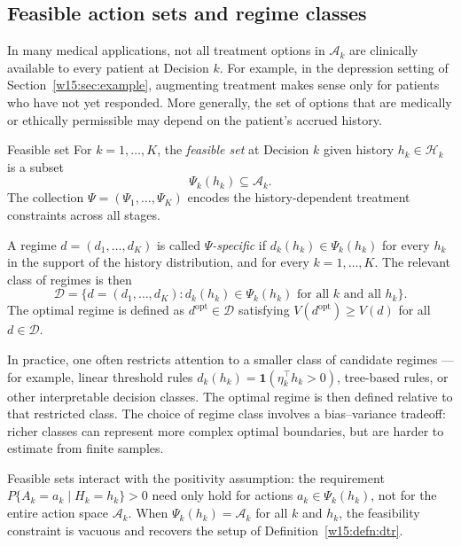 \documentclass[master.tex]{subfiles}
\begin{document}
\subsection{Feasible action sets and regime classes}

In many medical applications, not all treatment options in $\mathcal{A}_k$ are clinically available to every patient at Decision $k$. For example, in the depression setting of Section~\ref{w15:sec:example}, augmenting treatment makes sense only for patients who have not yet responded. More generally, the set of options that are medically or ethically permissible may depend on the patient's accrued history.

\begin{defn}{Feasible set}
\label{w15:defn:feasible}
For $k = 1,\ldots,K$, the \emph{feasible set} at Decision $k$ given history $h_k \in \mathcal{H}_k$ is a subset
\[
\Psi_k(h_k) \subseteq \mathcal{A}_k.
\]
The collection $\Psi = (\Psi_1,\ldots,\Psi_K)$ encodes the history-dependent treatment constraints across all stages.
\end{defn}

A regime $d = (d_1,\ldots,d_K)$ is called \emph{$\Psi$-specific} if $d_k(h_k) \in \Psi_k(h_k)$ for every $h_k$ in the support of the history distribution, and for every $k = 1,\ldots,K$. The relevant class of regimes is then
\[
\mathcal{D} = \{d = (d_1,\ldots,d_K) : d_k(h_k) \in \Psi_k(h_k) \text{ for all } k \text{ and all } h_k\}.
\]
The optimal regime is defined as $d^{\mathrm{opt}} \in \mathcal{D}$ satisfying $V(d^{\mathrm{opt}}) \geq V(d)$ for all $d \in \mathcal{D}$.

In practice, one often restricts attention to a smaller class of candidate regimes — for example, linear threshold rules $d_k(h_k) = \mathbf{1}(\eta_k^\top h_k > 0)$, tree-based rules, or other interpretable decision classes. The optimal regime is then defined relative to that restricted class. The choice of regime class involves a bias--variance tradeoff: richer classes can represent more complex optimal boundaries, but are harder to estimate from finite samples.

\begin{remark}
Feasible sets interact with the positivity assumption: the requirement $P\{A_k = a_k \mid H_k = h_k\} > 0$ need only hold for actions $a_k \in \Psi_k(h_k)$, not for the entire action space $\mathcal{A}_k$. When $\Psi_k(h_k) = \mathcal{A}_k$ for all $k$ and $h_k$, the feasibility constraint is vacuous and recovers the setup of Definition~\ref{w15:defn:dtr}.
\end{remark}
\end{document}
